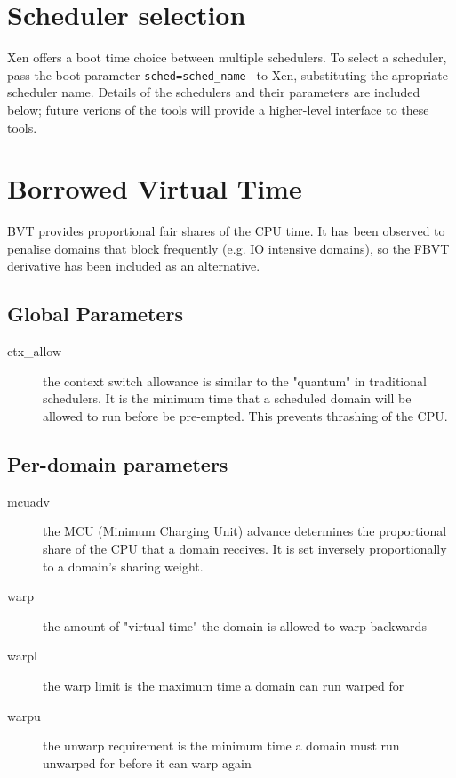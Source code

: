 \documentclass[11pt,twoside,final,openright]{xenstyle}
\begin{document}
\section{Scheduler selection}

Xen offers a boot time choice between multiple schedulers.  To select
a scheduler, pass the boot parameter { \tt sched=sched\_name } to Xen,
substituting the apropriate scheduler name.  Details of the schedulers
and their parameters are included below; future verions of the tools
will provide a higher-level interface to these tools.

\section{Borrowed Virtual Time}

BVT provides proportional fair shares of the CPU time.  It has been
observed to penalise domains that block frequently (e.g. IO intensive
domains), so the FBVT derivative has been included as an alternative.

\subsection{Global Parameters}

\begin{description}
\item[ctx\_allow]
  the context switch allowance is similar to the "quantum"
  in traditional schedulers.  It is the minimum time that
  a scheduled domain will be allowed to run before be
  pre-empted.  This prevents thrashing of the CPU.
\end{description}

\subsection{Per-domain parameters}

\begin{description}
\item[mcuadv]
  the MCU (Minimum Charging Unit) advance determines the
  proportional share of the CPU that a domain receives.  It
  is set inversely proportionally to a domain's sharing weight.
\item[warp]
  the amount of "virtual time" the domain is allowed to warp
  backwards
\item[warpl]
  the warp limit is the maximum time a domain can run warped for
\item[warpu]
  the unwarp requirement is the minimum time a domain must
  run unwarped for before it can warp again
\end{description}
\end{document}
